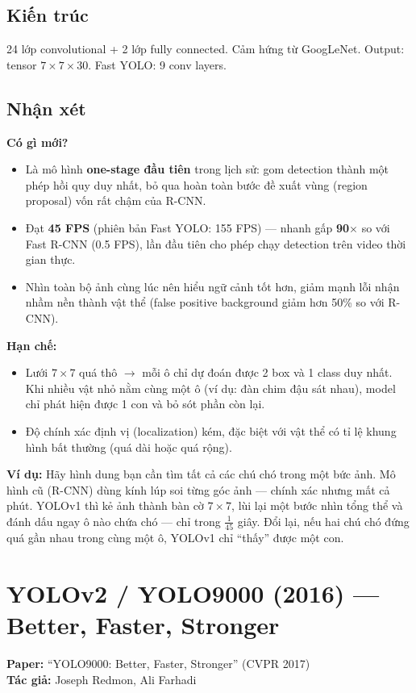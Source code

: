 \documentclass[12pt,a4paper]{report}
\begin{document}
\subsection{Kiến trúc}
24 lớp convolutional + 2 lớp fully connected. Cảm hứng từ GoogLeNet. Output: tensor $7 \times 7 \times 30$. Fast YOLO: 9 conv layers.

\subsection{Nhận xét}

\textbf{Có gì mới?}
\begin{itemize}
    \item Là mô hình \textbf{one-stage đầu tiên} trong lịch sử: gom detection thành một phép hồi quy duy nhất, bỏ qua hoàn toàn bước đề xuất vùng (region proposal) vốn rất chậm của R-CNN.
    \item Đạt \textbf{45 FPS} (phiên bản Fast YOLO: 155 FPS) --- nhanh gấp \textbf{90$\times$} so với Fast R-CNN (0.5 FPS), lần đầu tiên cho phép chạy detection trên video thời gian thực.
    \item Nhìn toàn bộ ảnh cùng lúc nên hiểu ngữ cảnh tốt hơn, giảm mạnh lỗi nhận nhầm nền thành vật thể (false positive background giảm hơn 50\% so với R-CNN).
\end{itemize}

\textbf{Hạn chế:}
\begin{itemize}
    \item Lưới $7\times7$ quá thô $\rightarrow$ mỗi ô chỉ dự đoán được 2 box và 1 class duy nhất. Khi nhiều vật nhỏ nằm cùng một ô (ví dụ: đàn chim đậu sát nhau), model chỉ phát hiện được 1 con và bỏ sót phần còn lại.
    \item Độ chính xác định vị (localization) kém, đặc biệt với vật thể có tỉ lệ khung hình bất thường (quá dài hoặc quá rộng).
\end{itemize}

\textbf{Ví dụ:} Hãy hình dung bạn cần tìm tất cả các chú chó trong một bức ảnh. Mô hình cũ (R-CNN) dùng kính lúp soi từng góc ảnh --- chính xác nhưng mất cả phút. YOLOv1 thì kẻ ảnh thành bàn cờ $7\times7$, lùi lại một bước nhìn tổng thể và đánh dấu ngay ô nào chứa chó --- chỉ trong $\frac{1}{45}$ giây. Đổi lại, nếu hai chú chó đứng quá gần nhau trong cùng một ô, YOLOv1 chỉ ``thấy'' được một con.

\section{YOLOv2 / YOLO9000 (2016) --- Better, Faster, Stronger}
\textbf{Paper:} ``YOLO9000: Better, Faster, Stronger'' (CVPR 2017) \cite{yolov2}\\
\textbf{Tác giả:} Joseph Redmon, Ali Farhadi
\end{document}
